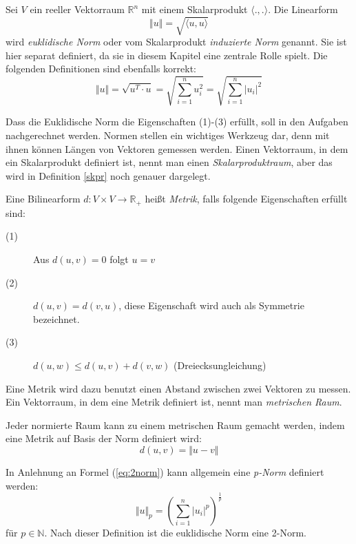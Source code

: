 \begin{definition}
Sei $V$ ein reeller Vektorraum $\mathbb{R}^n$ mit einem Skalarprodukt $\langle .,.\rangle$. Die Linearform 
\[
\Vert u \Vert = \sqrt{\langle u,u \rangle}
\]
wird \emph{euklidische Norm} oder vom Skalarprodukt \emph{induzierte Norm} genannt. Sie ist hier separat definiert, da sie in diesem Kapitel eine zentrale Rolle spielt. Die folgenden Definitionen sind ebenfalls korrekt:
\begin{equation}\label{eq:2norm}
\Vert u \Vert = \sqrt{u^T \cdot u} = \sqrt{\sum_{i=1}^{n} u_i^2}= \sqrt{\sum_{i=1}^{n} \vert u_i \vert^2}
\end{equation}
\end{definition}

Dass die Euklidische Norm die Eigenschaften (1)-(3) erfüllt, soll in den Aufgaben nachgerechnet werden. Normen stellen ein wichtiges Werkzeug dar, denn mit ihnen können Längen von Vektoren gemessen werden. Einen Vektorraum, in dem ein Skalarprodukt definiert ist, nennt man einen \emph{Skalarproduktraum}, aber das wird in Definition \ref{skpr} noch genauer dargelegt.

\begin{definition}
Eine Bilinearform $d : V\times V \longrightarrow \mathbb{R}_+$ heißt \emph{Metrik}, falls folgende Eigenschaften erfüllt sind:
\begin{description}
\item[(1)] Aus $d(u,v) = 0$ folgt $u=v$
\item[(2)] $d(u,v) = d(v,u)$, diese Eigenschaft wird auch als Symmetrie bezeichnet.
\item[(3)] $d(u,w) \le d(u,v) + d(v,w)$ (Dreiecksungleichung)
\end{description}
\end{definition}

Eine Metrik wird dazu benutzt einen Abstand zwischen zwei Vektoren zu messen. Ein Vektorraum, in dem eine Metrik definiert ist, nennt man \emph{metrischen Raum}. 

\begin{definition}
Jeder normierte Raum kann zu einem metrischen Raum gemacht werden, indem eine Metrik auf Basis der Norm definiert wird:
\[
d(u,v) = \Vert u-v \Vert
\]
\end{definition}

\begin{definition}
In Anlehnung an Formel (\ref{eq:2norm}) kann allgemein eine \emph{p-Norm} definiert werden:
\[
\Vert u \Vert_p = \left( \sum_{i=1}^{n} \vert u_i \vert^p \right)^{\frac{1}{p}}
\]
für $p\in \mathbb{N}$. Nach dieser Definition ist die euklidische Norm eine 2-Norm. 
\end{definition}

